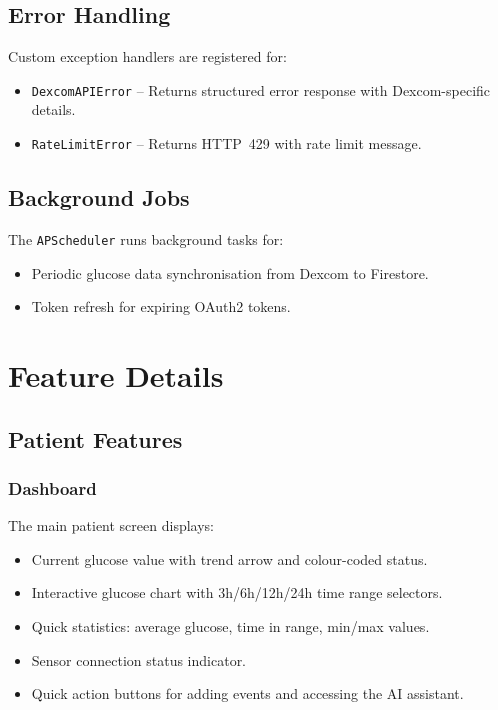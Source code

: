 \documentclass[12pt,a4paper]{article}
\begin{document}
\subsection{Error Handling}

Custom exception handlers are registered for:
\begin{itemize}
    \item \texttt{DexcomAPIError} -- Returns structured error response with Dexcom-specific details.
    \item \texttt{RateLimitError} -- Returns HTTP~429 with rate limit message.
\end{itemize}

\subsection{Background Jobs}

The \texttt{APScheduler} runs background tasks for:
\begin{itemize}
    \item Periodic glucose data synchronisation from Dexcom to Firestore.
    \item Token refresh for expiring OAuth2 tokens.
\end{itemize}

\section{Feature Details}

\subsection{Patient Features}

\subsubsection{Dashboard}
The main patient screen displays:
\begin{itemize}
    \item Current glucose value with trend arrow and colour-coded status.
    \item Interactive glucose chart with 3h/6h/12h/24h time range selectors.
    \item Quick statistics: average glucose, time in range, min/max values.
    \item Sensor connection status indicator.
    \item Quick action buttons for adding events and accessing the AI assistant.
\end{itemize}
\end{document}
